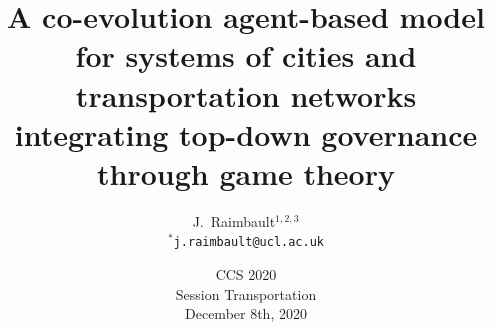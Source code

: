 



\title
[A co-evolution ABM for systems of cities]{A co-evolution agent-based model for systems of cities and transportation networks integrating top-down governance through game theory}
\author[Raimbault]{J.~Raimbault$^{1,2,3}$\\\medskip
$^{\ast}$\texttt{j.raimbault@ucl.ac.uk}
}





\date[08/12/2020]{CCS 2020\\
Session Transportation\\
December 8th, 2020\\
}

\frame{\maketitle}


